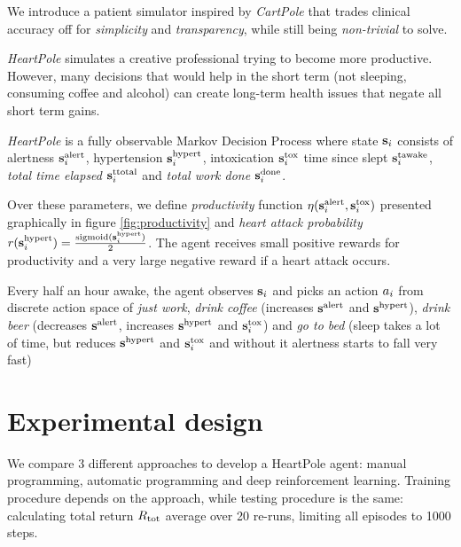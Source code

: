 We introduce a patient simulator inspired by \emph{CartPole} \cite{cartpole} that trades clinical accuracy off for \emph{simplicity} and \emph{transparency}, while still being \emph{non-trivial} to solve.

\emph{HeartPole} simulates a creative professional trying to become more productive.
However, many decisions that would help in the short term (not sleeping, consuming coffee and alcohol) can create long-term health issues that negate all short term gains.

\emph{HeartPole} is a fully observable Markov Decision Process \cite{mdp} where state $\textbf{s}_i$ consists of alertness $\textbf{s}^\text{alert}_i$, hypertension $\textbf{s}^\text{hypert}_i$, intoxication $\textbf{s}^\text{tox}_i$ time since slept $\textbf{s}^\text{tawake}_i$, \emph{total time elapsed} $\textbf{s}^\text{ttotal}_i$ and \emph{total work done} $\textbf{s}^\text{done}_i$.

Over these parameters, we define \emph{productivity} function $\eta(\textbf{s}^\text{alert}_i, \textbf{s}^\text{tox}_i)$ presented graphically in figure \ref{fig:productivity} and \emph{heart attack probability} $r(\textbf{s}^\text{hypert}_i)=\frac{\text{sigmoid}(\textbf{s}^\text{hypert}_i)}{2}$.
The agent receives small positive rewards for productivity and a very large negative reward if a heart attack occurs.

Every half an hour awake, the agent observes $\textbf{s}_i$ and picks an action $a_i$ from discrete action space of \emph{just work}, \emph{drink coffee} (increases $\textbf{s}^\text{alert}$ and $\textbf{s}^\text{hypert}$), \emph{drink beer} (decreases $\textbf{s}^\text{alert}$, increases $\textbf{s}^\text{hypert}$ and $\textbf{s}^\text{tox}_i$) and \emph{go to bed} (sleep takes a lot of time, but reduces $\textbf{s}^\text{hypert}$ and $\textbf{s}^\text{tox}_i$ and without it alertness starts to fall very fast)

\newpage
\section{Experimental design}
\label{sec:heartpole-experiments}

We compare 3 different approaches to develop a HeartPole agent: manual programming, automatic programming and deep reinforcement learning.
Training procedure depends on the approach, while testing procedure is the same: calculating total return $R_\text{tot}$ average over 20 re-runs, limiting all episodes to 1000 steps.

